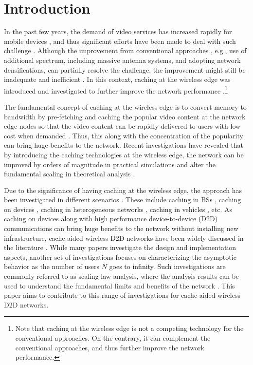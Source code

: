 \documentclass[journal,draftclsnofoot,onecolumn,12pt,twoside]{IEEEtran}
\begin{document}
\section{Introduction}

In the past few years, the demand of video services has increased rapidly for mobile devices \cite{Cisco_2017}, and thus significant efforts have been made to deal with such challenge \cite{wang2017survey,zhang20196g}. Although the improvement from conventional approaches \cite{Andrews:5G}, e.g., use of additional spectrum, including massive antenna systems, and adopting network densifications, can partially resolve the challenge, the improvement might still be inadequate and inefficient \cite{Gol:femtocaching}. In this context, caching at the wireless edge was introduced and investigated to further improve the network performance \cite{Gol:femtocaching}.\footnote{Note that caching at the wireless edge is not a competing technology for the conventional approaches. On the contrary, it can complement the conventional approaches, and thus further improve the network performance.} 

The fundamental concept of caching at the wireless edge is to convert memory to bandwidth by pre-fetching and caching the popular video content at the network edge nodes so that the video content can be rapidly delivered to users with low cost when demanded \cite{Gol:femtocaching}. Thus, this along with the concentration of the popularity can bring huge benefits to the network. Recent investigations have revealed that by introducing the caching technologies at the wireless edge, the network can be improved by orders of magnitude in practical simulations \cite{Ji:Dcache,li2018survey} and alter the fundamental scaling in theoretical analysis \cite{Maddah-Ali:CCache,Ji:Th_Out_toff,lee2019throughput,lee2020optimal}.

Due to the significance of having caching at the wireless edge, the approach has been investigated in different scenarios \cite{li2018survey,ahmed2019video,mehrabi2019device,prerna2020device}. These include caching in BSs \cite{Gol:femtocaching}, caching on devices \cite{Ji:Dcache}, caching in heterogeneous networks \cite{li2017collaborative}, caching in vehicles \cite{hu2018mobility}, etc. As caching on devices along with high performance device-to-device (D2D) communications can bring huge benefits to the network without installing new infrastructure, cache-aided wireless D2D networks have been widely discussed in the literature \cite{ahmed2019video,mehrabi2019device,prerna2020device}. While many papers investigate the design and implementation aspects, another set of investigations focuses on characterizing the asymptotic behavior as the number of users $N$ goes to infinity. Such investigations are commonly referred to as scaling law analysis, where the analysis results can be used to understand the fundamental limits and benefits of the network \cite{Ji:Th_Out_toff,lee2019throughput,lee2020optimal}. This paper aims to contribute to this range of investigations for cache-aided wireless D2D networks.
\end{document}
